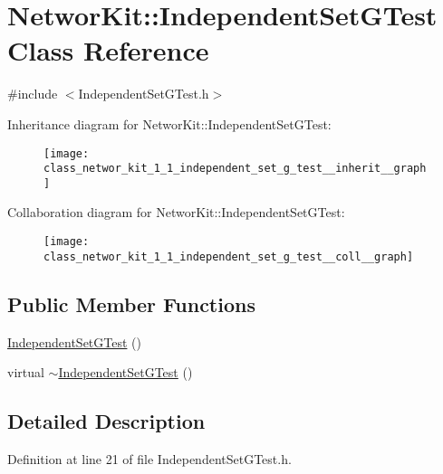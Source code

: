 \hypertarget{class_networ_kit_1_1_independent_set_g_test}{\section{Networ\-Kit\-:\-:Independent\-Set\-G\-Test Class Reference}
\label{class_networ_kit_1_1_independent_set_g_test}
}


{\ttfamily \#include $<$Independent\-Set\-G\-Test.\-h$>$}



Inheritance diagram for Networ\-Kit\-:\-:Independent\-Set\-G\-Test\-:\nopagebreak
\begin{figure}[H]
\begin{center}
\leavevmode
\texttt{[image: class\_networ\_kit\_1\_1\_independent\_set\_g\_test\_\_inherit\_\_graph]}
\end{center}
\end{figure}


Collaboration diagram for Networ\-Kit\-:\-:Independent\-Set\-G\-Test\-:\nopagebreak
\begin{figure}[H]
\begin{center}
\leavevmode
\texttt{[image: class\_networ\_kit\_1\_1\_independent\_set\_g\_test\_\_coll\_\_graph]}
\end{center}
\end{figure}
\subsection*{Public Member Functions}
\begin{DoxyCompactItemize}
\item 
\hyperlink{class_networ_kit_1_1_independent_set_g_test_a11cb8cf9d967d0cb8b18ccf870d8b49d}{Independent\-Set\-G\-Test} ()
\item 
virtual \hyperlink{class_networ_kit_1_1_independent_set_g_test_a2300ad25bc27c0c2455566123524d9c6}{$\sim$\-Independent\-Set\-G\-Test} ()
\end{DoxyCompactItemize}


\subsection{Detailed Description}


Definition at line 21 of file Independent\-Set\-G\-Test.\-h.



